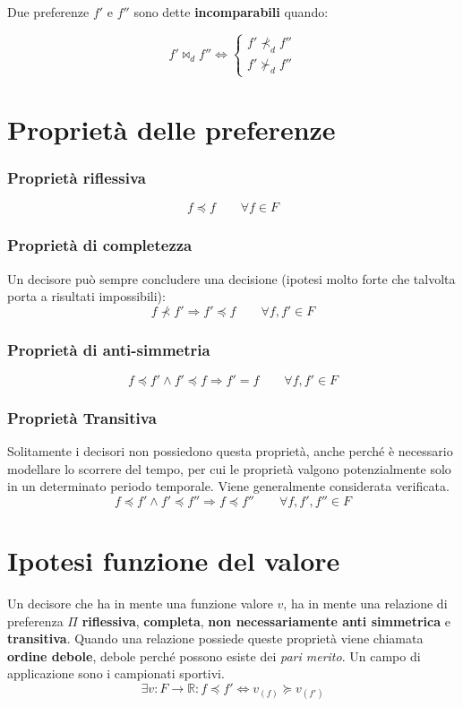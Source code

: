 \documentclass[\main/main.tex]{subfiles}
\begin{document}
\begin{definition}[Incomparabilità]
	Due preferenze $f'$ e $f''$ sono dette \textbf{incomparabili} quando:

	\[
		f' \Join_d f'' \Leftrightarrow
		\begin{cases}
			f' \nprec_d f'' \\
			f' \nsucc_d f''
		\end{cases}
	\]
\end{definition}


\section{Proprietà delle preferenze}
\subsubsection{Proprietà riflessiva}
\[
	f \preccurlyeq f \qquad \forall f \in F
\]

\subsubsection{Proprietà di completezza}
Un decisore può sempre concludere una decisione (ipotesi molto forte che talvolta porta a risultati impossibili):
\[
	f \nprec f' \Rightarrow f' \preccurlyeq f \qquad \forall f, f' \in F
\]

\subsubsection{Proprietà di anti-simmetria}
\[
	f \preccurlyeq f' \wedge f' \preccurlyeq f \Rightarrow f' = f \qquad \forall f, f' \in F
\]

\subsubsection{Proprietà Transitiva}
Solitamente i decisori non possiedono questa proprietà, anche perché è necessario modellare lo scorrere del tempo, per cui le proprietà valgono potenzialmente solo in un determinato periodo temporale. Viene generalmente considerata verificata.
\[
	f \preccurlyeq f' \wedge f' \preccurlyeq f'' \Rightarrow f \preccurlyeq f'' \qquad \forall f, f', f'' \in F
\]

\section{Ipotesi funzione del valore}
Un decisore che ha in mente una funzione valore $v$, ha in mente una relazione di preferenza $\Pi$ \textbf{riflessiva}, \textbf{completa}, \textbf{non necessariamente anti simmetrica} e \textbf{transitiva}. Quando una relazione possiede queste proprietà viene chiamata \textbf{ordine debole}, debole perché possono esiste dei \textit{pari merito}. Un campo di applicazione sono i campionati sportivi.
\[
	\exists v: F\rightarrow \mathbb{R}: f \preccurlyeq f' \Leftrightarrow v_{(f)} \succcurlyeq v_{(f')}
\]
\end{document}
